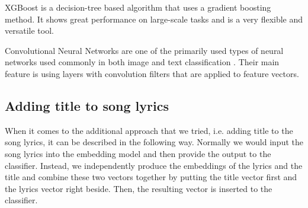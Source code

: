 XGBoost \cite{xgboostRef} is a decision-tree based algorithm that uses a gradient boosting method. It shows great performance on large-scale tasks and is a very flexible and versatile tool.

Convolutional Neural Networks are one of the primarily used types of neural networks used commonly in both image and text classification \cite{cnnRef}. Their main feature is using layers with convolution filters that are applied to feature vectors.

\subsection{Adding title to song lyrics}\label{title}
When it comes to the additional approach that we tried, i.e. adding title to the song lyrics, it can be described in the following way. Normally we would input the song lyrics into the embedding model and then provide the output to the classifier. Instead, we independently produce the embeddings of the lyrics and the title and combine these two vectors together by putting the title vector first and the lyrics vector right beside. Then, the resulting vector is inserted to the classifier.

